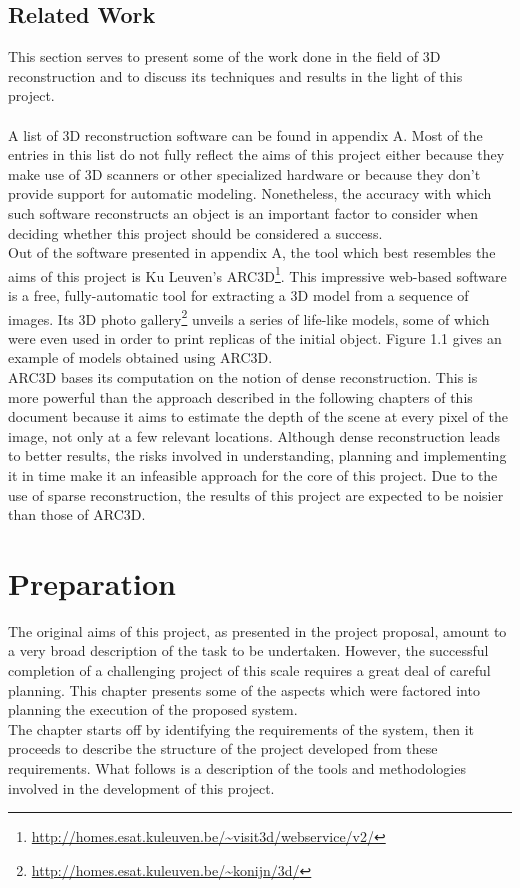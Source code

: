\documentclass[12pt,a4paper,twoside,openright]{report}
\begin{document}
\section{Related Work}
This section serves to present some of the work done in the field of 3D reconstruction and to discuss its techniques and results in the light of this project.\\
   \\
\linebreak
A list of 3D reconstruction software can be found in appendix A. Most of the entries in this list do not fully reflect the aims of this project either because they make use of 3D scanners or other specialized hardware or because they don't provide support for automatic modeling. Nonetheless, the accuracy with which such software reconstructs an object is an important factor to consider when deciding whether this project should be considered a success.\\
\linebreak
Out of the software presented in appendix A, the tool which best resembles the aims of this project is Ku Leuven's ARC3D\footnote{\url{http://homes.esat.kuleuven.be/~visit3d/webservice/v2/}}. This impressive web-based software is a free, fully-automatic tool for extracting a 3D model from a sequence of images. Its 3D photo gallery\footnote{\url{http://homes.esat.kuleuven.be/~konijn/3d/}} unveils a series of life-like models, some of which were even used in order to print replicas of the initial object. Figure 1.1 gives an example of models obtained using ARC3D.\\
\linebreak
ARC3D bases its computation on the notion of dense reconstruction\cite{tingdahl_lncs_11}. This is more powerful than the approach described in the following chapters of this document because it aims to estimate the depth of the scene at every pixel of the image, not only at a few relevant locations. Although dense reconstruction leads to better results, the risks involved in understanding, planning and implementing it in time make it an infeasible approach for the core of this project. Due to the use of sparse reconstruction, the results of this project are expected to be noisier than those of ARC3D. 


\chapter{Preparation}
The original aims of this project, as presented in the project proposal, amount to a very broad description of the task to be undertaken. However, the successful completion of a challenging project of this scale requires a great deal of careful planning. This chapter presents some of the aspects which were factored into planning the execution of the proposed system.\\
\linebreak
The chapter starts off by identifying the requirements of the system, then it proceeds to describe the structure of the project developed from these requirements. What follows is a description of the tools and methodologies involved in the development of this project. 
\end{document}
